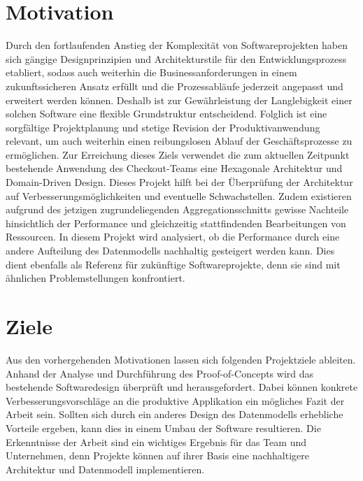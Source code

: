 \section{Motivation}

Durch den fortlaufenden Anstieg der Komplexität von Softwareprojekten \cite{Darcy.2010} haben sich gängige Designprinzipien und Architekturstile für den Entwicklungsprozess etabliert, sodass auch weiterhin die Businessanforderungen in einem zukunftssicheren Ansatz erfüllt und die Prozessabläufe jederzeit angepasst und erweitert werden können. Deshalb ist zur Gewährleistung der Langlebigkeit einer solchen Software eine flexible Grundstruktur entscheidend. Folglich ist eine sorgfältige Projektplanung und stetige Revision der Produktivanwendung relevant, um auch weiterhin einen reibungslosen Ablauf der Geschäftsprozesse zu ermöglichen. Zur Erreichung dieses Ziels verwendet die zum aktuellen Zeitpunkt bestehende Anwendung des Checkout-Teams eine Hexagonale Architektur und Domain-Driven Design. Dieses Projekt hilft bei der Überprüfung der Architektur auf Verbesserungsmöglichkeiten und eventuelle Schwachstellen. Zudem existieren aufgrund des jetzigen zugrundeliegenden Aggregationsschnitts gewisse Nachteile hinsichtlich der Performance und gleichzeitig stattfindenden Bearbeitungen von Ressourcen. In diesem Projekt wird analysiert, ob die Performance durch eine andere Aufteilung des Datenmodells nachhaltig gesteigert werden kann. Dies dient ebenfalls als Referenz für zukünftige Softwareprojekte, denn sie sind mit ähnlichen Problemstellungen konfrontiert.



\section{Ziele}

Aus den vorhergehenden Motivationen lassen sich folgenden Projektziele ableiten. Anhand der Analyse und Durchführung des Proof-of-Concepts wird das bestehende Softwaredesign überprüft und herausgefordert. Dabei können konkrete Verbesserungsvorschläge an die produktive Applikation ein mögliches Fazit der Arbeit sein. Sollten sich durch ein anderes Design des Datenmodells erhebliche Vorteile ergeben, kann dies in einem Umbau der Software resultieren. Die Erkenntnisse der Arbeit sind ein wichtiges Ergebnis für das Team und Unternehmen, denn Projekte können auf ihrer Basis eine nachhaltigere Architektur und Datenmodell implementieren.
